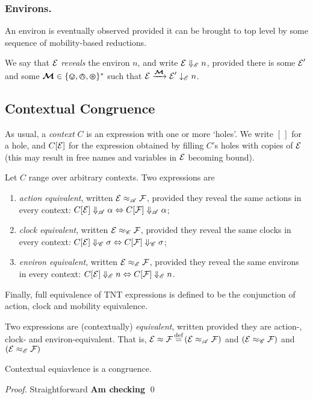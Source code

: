 \documentclass[orivec,envcountsame]{llncs}
\newcommand{\Exhibits}[1]{\mathrel{\downarrow_{#1}}}
\newcommand{\ExhibitsE}{\Exhibits{\mathscr{E}}}
\newcommand{\Reveals}[1]{\mathrel{\Downarrow_{#1}}}
\newcommand{\RevealsA}{\Reveals{\mathscr{A}}}
\newcommand{\RevealsC}{\Reveals{\mathscr{C}}}
\newcommand{\RevealsE}{\Reveals{\mathscr{E}}}
\newcommand{\Eq}{\approx}
\newcommand{\EqA}{\mathrel{\Eq_{\mathscr{A}}}}
\newcommand{\EqC}{\mathrel{\Eq_{\mathscr{C}}}}
\newcommand{\EqE}{\mathrel{\Eq_{\mathscr{E}}}}
\newcommand{\Means}{\eqdef}
\newcommand{\Does}[1]{\xderives{#1}}
\begin{document}
\subsubsection{Environs.}

An environ is eventually observed provided it can be brought to top level by some sequence of mobility-based reductions.

\begin{definition}
We say that $\text{$\mathcal{E}$}$ \emph{reveals} the environ $n$, and write $\expr \RevealsE n$, provided there is some $\text{$\mathcal{E}$}'$ and some $\vec{\ambop} \in \{\tin, \tout, \topen\}^*$ such that $\expr \Does{\vec{\ambop}} \expr' \ExhibitsE n$.
\end{definition}



\subsection{Contextual Congruence}
\label{sec:contextual-congruence}

As usual, a \emph{context} $C$ is an expression with one or more `holes'. We write $[\,]$ for a hole, and $C[\text{$\mathcal{E}$}]$ for the expression obtained by filling $C$'s holes with copies of $\text{$\mathcal{E}$}$ (this may result in free names and variables in $\text{$\mathcal{E}$}$ becoming bound).

\begin{definition}
Let $C$ range over arbitrary contexts. Two expressions are
\begin{enumerate}
\item
    \emph{action equivalent}, written $\expr \EqA \exprb$, provided they reveal the same actions in every context: $C[\expr] \RevealsA \alpha \Leftrightarrow C[\exprb] \RevealsA \alpha$;
\item
    \emph{clock equivalent}, written $\expr \EqC \exprb$, provided they reveal the same clocks in every context: $C[\expr] \RevealsC \sigma \Leftrightarrow C[\exprb] \RevealsC \sigma$;

\item
    \emph{environ equivalent}, written $\expr \EqE \exprb$, provided they reveal the same environs in every context: $C[\expr] \RevealsE n \Leftrightarrow C[\exprb] \RevealsE n$.
\end{enumerate}
\end{definition}

Finally, full equivalence of TNT expressions is defined to be the conjunction of action, clock and mobility equivalence.
\begin{definition}
Two expressions are (contextually) \emph{equivalent}, written provided they are action-, clock- and environ-equivalent. That is,
    $\expr \Eq \exprb
     \Means
     \left( \expr \EqA \exprb \right)$
     and
     $\left( \expr \EqC \exprb \right)$
     and
     $\left( \expr \EqE \exprb \right)$
\end{definition}

\begin{lemma}
Contextual equiavlence is a congruence.
\end{lemma}
\begin{proof}
Straightforward \textbf{Am checking}
\qed \end{proof}





\end{document}

